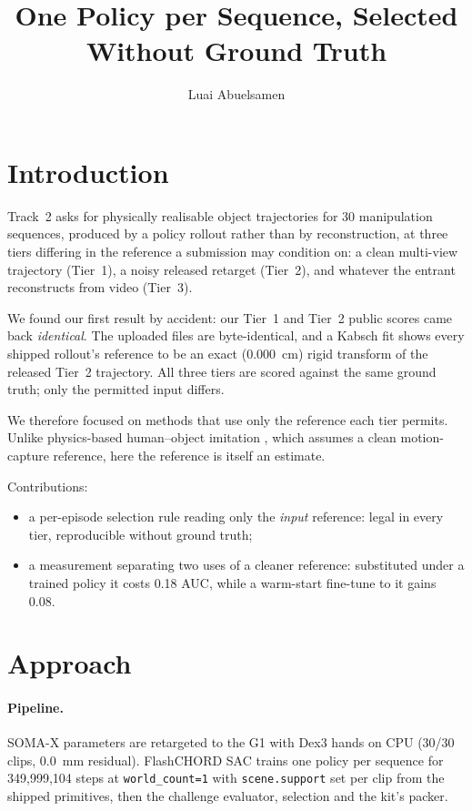 \documentclass[10pt]{nvidiaextabstract}
\title{One Policy per Sequence, Selected Without Ground Truth}
\author[1]{Luai Abuelsamen}
\affil[1]{University of California, Berkeley}
\affil[ ]{\texttt{luai\_abuelsamen@berkeley.edu}}
\begin{document}
\maketitle

\section{Introduction}
\label{sec:intro}

Track~2 asks for physically realisable object trajectories for 30 manipulation sequences,
produced by a policy rollout rather than by reconstruction, at three tiers differing in the
reference a submission may condition on: a clean multi-view trajectory (Tier~1), a noisy released
retarget (Tier~2), and whatever the entrant reconstructs from video (Tier~3).

We found our first result by accident: our Tier~1 and Tier~2 public scores came back
\emph{identical}. The uploaded files are byte-identical, and a Kabsch fit shows every
shipped rollout's reference to be an exact (0.000~cm) rigid transform of the released Tier~2
trajectory. All three tiers are scored against the same ground truth; only the permitted input
differs.

We therefore focused on methods that use only the reference each tier permits. Unlike physics-based human--object imitation \citep{physhoi,intermimic}, which assumes a clean
motion-capture reference, here the reference is itself an estimate.

\noindent Contributions:
\begin{itemize}\itemsep0pt
  \item a per-episode selection rule reading only the \emph{input} reference: legal in every tier,
        reproducible without ground truth;
  \item a measurement separating two uses of a cleaner reference: substituted under a trained
        policy it costs 0.18 AUC, while a warm-start fine-tune to it gains 0.08.
\end{itemize}

\section{Approach}
\label{sec:approach}

\paragraph{Pipeline.} SOMA-X parameters are retargeted to the G1 with Dex3 hands on CPU (30/30
clips, 0.0~mm residual). FlashCHORD SAC trains one policy per sequence for 349{,}999{,}104 steps
at \texttt{world\_count=1} with \texttt{scene.support} set per clip from the shipped primitives,
then the challenge evaluator, selection and the kit's packer.
\end{document}
